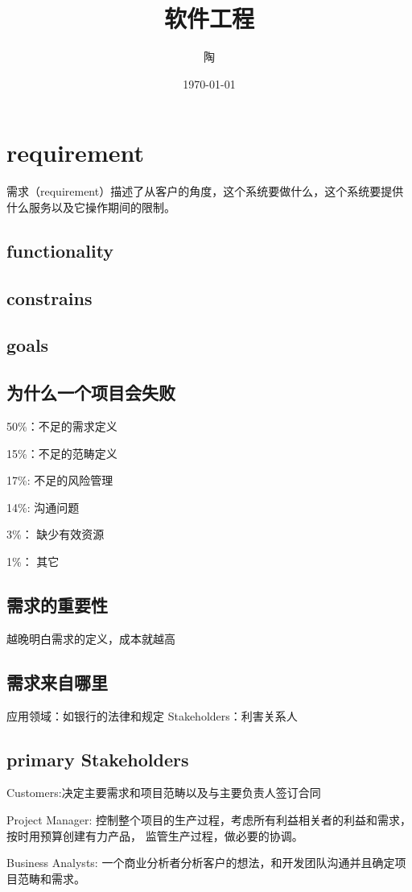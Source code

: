 \documentclass{ctexart}
\title{软件工程}
\author{陶}
\date{\today}
\begin{document}
\maketitle
\tableofcontents

\section{requirement}
\label{sec:first}
需求（requirement）描述了从客户的角度，这个系统要做什么，这个系统要提供什么服务以及它操作期间的限制。

\subsection{functionality}
\subsection{constrains}
\subsection{goals}
\subsection{为什么一个项目会失败}
50\%：不足的需求定义

15\%：不足的范畴定义

17\%: 不足的风险管理

14\%: 沟通问题

3\%： 缺少有效资源

1\%： 其它
\subsection{需求的重要性}
越晚明白需求的定义，成本就越高
\subsection{需求来自哪里}
应用领域：如银行的法律和规定
Stakeholders：利害关系人
\subsection{primary Stakeholders}
Customers:决定主要需求和项目范畴以及与主要负责人签订合同

Project Manager: 控制整个项目的生产过程，考虑所有利益相关者的利益和需求，按时用预算创建有力产品，
监管生产过程，做必要的协调。

Business Analysts: 一个商业分析者分析客户的想法，和开发团队沟通并且确定项目范畴和需求。
\end{document}
